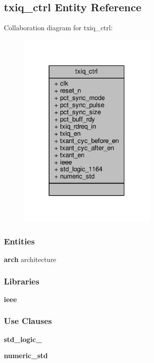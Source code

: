 \subsection{txiq\+\_\+ctrl Entity Reference}
\label{classtxiq__ctrl}


Collaboration diagram for txiq\+\_\+ctrl\+:\nopagebreak
\begin{figure}[H]
\begin{center}
\leavevmode
\includegraphics[width=196pt]{df/da6/classtxiq__ctrl__coll__graph}
\end{center}
\end{figure}
\subsubsection*{Entities}
\begin{DoxyCompactItemize}
\item 
{\bf arch} architecture
\end{DoxyCompactItemize}
\subsubsection*{Libraries}
 \begin{DoxyCompactItemize}
\item 
{\bf ieee} 
\end{DoxyCompactItemize}
\subsubsection*{Use Clauses}
 \begin{DoxyCompactItemize}
\item 
{\bf std\+\_\+logic\+\_}   
\item 
{\bf numeric\+\_\+std}   
\end{DoxyCompactItemize}
